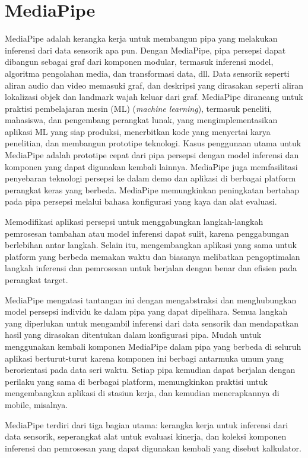 \section{MediaPipe}
MediaPipe adalah kerangka kerja untuk membangun pipa yang melakukan inferensi dari data sensorik apa pun. Dengan MediaPipe, pipa persepsi dapat dibangun sebagai graf dari komponen modular, termasuk inferensi model, algoritma pengolahan media, dan transformasi data, dll. Data sensorik seperti aliran audio dan video memasuki graf, dan deskripsi yang dirasakan seperti aliran lokalizasi objek dan landmark wajah keluar dari graf. MediaPipe dirancang untuk praktisi pembelajaran mesin (ML) (\emph{machine learning}), termasuk peneliti, mahasiswa, dan pengembang perangkat lunak, yang mengimplementasikan aplikasi ML yang siap produksi, menerbitkan kode yang menyertai karya penelitian, dan membangun prototipe teknologi. Kasus penggunaan utama untuk MediaPipe adalah prototipe cepat dari pipa persepsi dengan model inferensi dan komponen yang dapat digunakan kembali lainnya. MediaPipe juga memfasilitasi penyebaran teknologi persepsi ke dalam demo dan aplikasi di berbagai platform perangkat keras yang berbeda. MediaPipe memungkinkan peningkatan bertahap pada pipa persepsi melalui bahasa konfigurasi yang kaya dan alat evaluasi. \parencite{MediaPipe}

Memodifikasi aplikasi persepsi untuk menggabungkan langkah-langkah pemrosesan tambahan atau model inferensi dapat sulit, karena penggabungan berlebihan antar langkah. Selain itu, mengembangkan aplikasi yang sama untuk platform yang berbeda memakan waktu dan biasanya melibatkan pengoptimalan langkah inferensi dan pemrosesan untuk berjalan dengan benar dan efisien pada perangkat target.

MediaPipe mengatasi tantangan ini dengan mengabstraksi dan menghubungkan model persepsi individu ke dalam pipa yang dapat dipelihara. Semua langkah yang diperlukan untuk mengambil inferensi dari data sensorik dan mendapatkan hasil yang dirasakan ditentukan dalam konfigurasi pipa. Mudah untuk menggunakan kembali komponen MediaPipe dalam pipa yang berbeda di seluruh aplikasi berturut-turut karena komponen ini berbagi antarmuka umum yang berorientasi pada data seri waktu. Setiap pipa kemudian dapat berjalan dengan perilaku yang sama di berbagai platform, memungkinkan praktisi untuk mengembangkan aplikasi di stasiun kerja, dan kemudian menerapkannya di mobile, misalnya. \parencite{MediaPipe}

MediaPipe terdiri dari tiga bagian utama: kerangka kerja untuk inferensi dari data sensorik, seperangkat alat untuk evaluasi kinerja, dan koleksi komponen inferensi dan pemrosesan yang dapat digunakan kembali yang disebut kalkulator.

